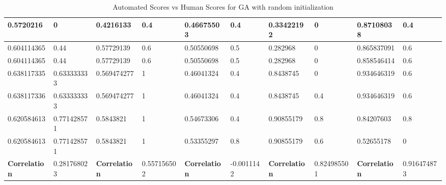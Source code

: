\begin{landscape}
\begin{table}[!ht]
\begin{tabular}{|p{0.8in}|p{0.8in}|p{0.8in}|p{0.8in}|p{0.8in}|p{0.8in}|p{0.8in}|p{0.8in}|p{0.8in}|p{0.8in}|}
		\hline
		0.5720216 & 0 & 0.4216133 & 0.4 & 0.46675503 & 0.4 & 0.33422192 & 0 & 0.87108038 & 0.4\\
		\hline
		0.604114365 & 0.44 & 0.57729139 & 0.6 & 0.50550698 & 0.5 & 0.282968 & 0 & 0.865837091 & 0.6\\
		\hline
		0.604114365 & 0.44 & 0.57729139 & 0.6 & 0.50550698 & 0.5 & 0.282968 & 0 & 0.858546414 & 0.6\\
		\hline
		0.638117335 & 0.633333333 & 0.569474277 & 1 & 0.46041324 & 0.4 & 0.8438745 & 0 & 0.934646319 & 0.6\\
		\hline
		0.638117336 & 0.633333333 & 0.569474277 & 1 & 0.46041324 & 0.4 & 0.8438745 & 0.4 & 0.934646319 & 0.6\\
		\hline
		0.620584613 & 0.771428571 & 0.5843821 & 1 & 0.54673306 & 0.4 & 0.90855179 & 0.8 & 0.84207603 & 0.8\\
		\hline
		0.620584613 & 0.771428571 & 0.5843821 & 1 & 0.53355297 & 0.8 & 0.90855179 & 0.6 & 0.52655178 & 0\\
		\hline
		\textbf{Correlation} & 0.281768023 & \textbf{Correlation} & 0.557156502 & \textbf{Correlation} & -0.0011142 & \textbf{Correlation} & 0.824985501 & \textbf{Correlation} & 0.916474873\\
		\hline
	\end{tabular}
	\caption{Automated Scores vs Human Scores for GA with random initialization}
	\label{Table:randomScores}
\end{table}
\end{landscape}

